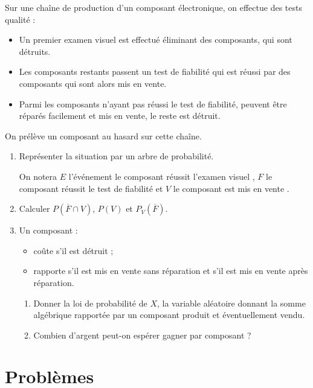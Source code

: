 \documentclass[12pt,a4paper,french]{article}
\begin{document}
\begin{question}
    Sur une chaîne de production d'un composant électronique, on effectue des tests qualité :
  \begin{itemize}
    \item Un premier examen visuel est effectué éliminant  des composants, qui sont détruits.
    \item Les composants restants passent un test de fiabilité qui est réussi par  des composants qui sont alors mis en vente.
    \item Parmi les composants n'ayant pas réussi le test de fiabilité,  peuvent être réparés facilement et mis en vente, le reste est détruit.
  \end{itemize}
  On prélève un composant au hasard sur cette chaîne.
  \begin{enumerate}
    \item Représenter la situation par un arbre de probabilité.

      On notera $E$ l'événement \og le composant réussit l'examen
      visuel \fg{}, $F$ \og le composant réussit le test de fiabilité
      \fg{} et $V$ \og le composant est mis en vente \fg{}.
    \item Calculer $P\left(\overline{F}\cap V\right)$, $P(V)$ et
      $P_V\left(\overline{F}\right)$.
    \item Un composant :
        \begin{itemize}
        \item coûte  s'il est détruit ;
        \item rapporte  s'il est mis en vente sans
          réparation et  s'il est mis en vente après
          réparation.
        \end{itemize}
        \vspace{-\baselineskip}\begin{enumerate}
        \item Donner la loi de probabilité de $X$, la variable
          aléatoire donnant la somme algébrique rapportée par un
          composant produit et éventuellement vendu.
        \item Combien d'argent peut-on \og espérer \fg{} gagner par
          composant ?
        \end{enumerate}
  \end{enumerate}
\end{question}

\section{Problèmes}


\bigskip

\printsolutions
\end{document}
